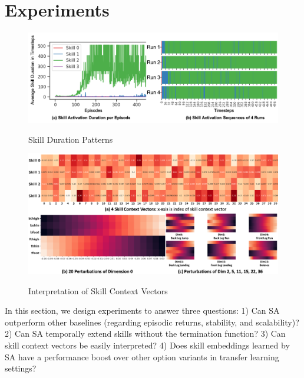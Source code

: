 
\section{Experiments}
\label{sec:exp}
\vspace{-2mm}

\begin{figure}[h]
  \centering
  \includegraphics[width=0.7\linewidth]{./Part1/figures/skill_sequence_joint.png}\\
  \vspace{-4mm}\caption{\label{fig:skill_sequence} Skill Duration
  Patterns}\vspace{-3mm}
\end{figure}
\begin{figure}[h]
  \centering
  \includegraphics[width=0.75\linewidth]{./Part1/figures/Interp_joint.png}\\
  \vspace{-4mm}\caption{\label{fig:interp_joint} Interpretation
    of Skill Context Vectors}\vspace{-4mm}
\end{figure}

In this section, we design experiments to answer three questions:
1) Can SA outperform other baselines (regarding episodic returns,
stability, and scalability)? 2) Can SA temporally extend skills
without the termination function? 3) Can skill context vectors be
easily interpreted? 4) Does skill embeddings learned by SA have a
performance boost over other option variants in transfer learning
settings?

